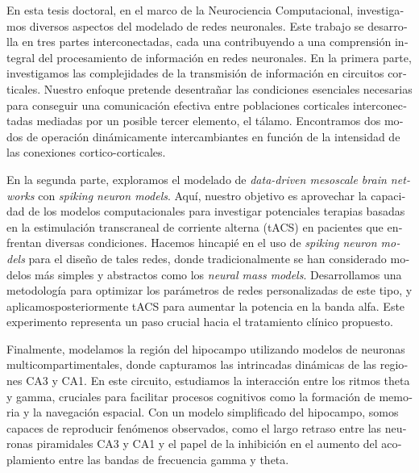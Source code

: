 \documentclass[../main.tex]{subfiles}
\begin{document}
\begin{otherlanguage}{spanish}
En esta tesis doctoral, en el marco de la Neurociencia Computacional, investigamos diversos aspectos del modelado de redes neuronales.
Este trabajo se desarrolla en tres partes interconectadas, cada una contribuyendo a una comprensión integral del procesamiento de información en redes neuronales.
En la primera parte, investigamos las complejidades de la transmisión de información en circuitos corticales.
Nuestro enfoque pretende desentrañar las condiciones esenciales necesarias para conseguir una comunicación efectiva entre poblaciones corticales interconectadas mediadas por un posible tercer elemento, el tálamo.
Encontramos dos modos de operación dinámicamente intercambiantes en función de la intensidad de las conexiones cortico-corticales.

En la segunda parte, exploramos el modelado de \textit{data-driven mesoscale brain networks} con \textit{spiking neuron models}.
Aquí, nuestro objetivo es aprovechar la capacidad de los modelos computacionales para investigar potenciales terapias basadas en la estimulación transcraneal de corriente alterna (tACS) en pacientes que enfrentan diversas condiciones.
Hacemos hincapié en el uso de \textit{spiking neuron models} para el diseño de tales redes, donde tradicionalmente se han considerado modelos más simples y abstractos como los \textit{neural mass models}.
Desarrollamos una metodología para optimizar los parámetros de redes personalizadas de este tipo, y aplicamosposteriormente tACS para aumentar la potencia en la banda alfa.
Este experimento representa un paso crucial hacia el tratamiento clínico propuesto.

Finalmente, modelamos la región del hipocampo utilizando modelos de neuronas multicompartimentales, donde capturamos las intrincadas dinámicas de las regiones CA3 y CA1.
En este circuito, estudiamos la interacción entre los ritmos theta y gamma, cruciales para facilitar procesos cognitivos como la formación de memoria y la navegación espacial.
Con un modelo simplificado del hipocampo, somos capaces de reproducir fenómenos observados, como el largo retraso entre las neuronas piramidales CA3 y CA1 y el papel de la inhibición en el aumento del acoplamiento entre las bandas de frecuencia gamma y theta.


\end{otherlanguage}
\end{document}
